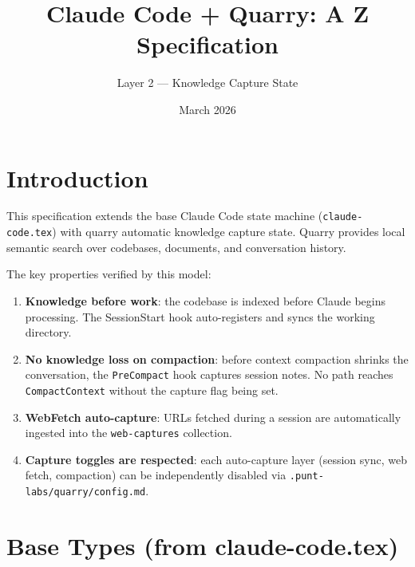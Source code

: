 \documentclass[a4paper,10pt,fleqn]{article}
\begin{document}
\title{Claude Code + Quarry: A Z Specification}
\author{Layer 2 --- Knowledge Capture State}
\date{March 2026}
\maketitle

\tableofcontents
\newpage

\section{Introduction}

This specification extends the base Claude Code state machine
(\texttt{claude-code.tex}) with quarry automatic knowledge capture
state. Quarry provides local semantic search over codebases,
documents, and conversation history.

The key properties verified by this model:

\begin{enumerate}
  \item \textbf{Knowledge before work}: the codebase is
    indexed before Claude begins processing.  The
    SessionStart hook auto-registers and syncs the working
    directory.
  \item \textbf{No knowledge loss on compaction}: before context
    compaction shrinks the conversation, the \texttt{PreCompact} hook
    captures session notes. No path reaches \texttt{CompactContext}
    without the capture flag being set.
  \item \textbf{WebFetch auto-capture}: URLs fetched during a session
    are automatically ingested into the \texttt{web-captures} collection.
  \item \textbf{Capture toggles are respected}: each auto-capture
    layer (session sync, web fetch, compaction) can be independently
    disabled via \texttt{.punt-labs/quarry/config.md}.
\end{enumerate}

\section{Base Types (from claude-code.tex)}
\end{document}
